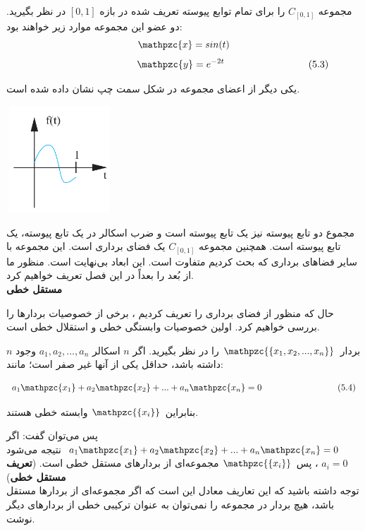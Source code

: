 \documentclass[a4paper,12pt]{report}
\begin{document}
	مجموعه $ C_{[0,1]} $ را برای تمام توابع پیوسته تعریف شده در بازه $ [0,1] $ در نظر بگیرید. دو عضو این مجموعه موارد زیر خواهند بود:
	$$
	 \mathpzc{x}=sin(t) 
	$$
	$$
	\hspace{3.5cm}  \mathpzc{y}=e^{-2t} \hspace{3cm} (5.3)
	$$ 
	
	یکی دیگر از اعضای مجموعه در شکل سمت چپ نشان داده شده است.
	
	\marginpar
	{
		\includegraphics[width=4cm, height=4cm]{125-1}	
	}
	
	مجموع دو تابع پیوسته نیز یک تابع پیوسته است و ضرب اسکالر در یک تابع پیوسته، یک تابع پیوسته است. همچنین مجموعه $ C_{[0,1]} $ یک فضای برداری است. این مجموعه با سایر فضاهای برداری که بحث کردیم متفاوت است. این ابعاد بی‌نهایت است. منظور ما از بُعد را بعداً در این فصل تعریف خواهیم کرد.\\
	
	\noindent\textbf{\Large{مستقل خطی}}
	
	حال که منظور از فضای برداری را تعریف کردیم ، برخی از خصوصیات بردارها را بررسی خواهیم کرد. اولین خصوصیات وابستگی خطی و استقلال خطی است.
	
	$ n $ بردار
	$ \mathpzc{\{x_1, x_2, ... ,x_n\}} $
	را در نظر بگیرید. اگر $ n $ اسکالر
	$ a_1, a_2, ... ,a_n $
	 وجود داشته باشد، حداقل یکی از آنها غیر صفر است؛ مانند:
	
	$$
	a_1\mathpzc{x_1} + a_2\mathpzc{x_2} + ... + a_n\mathpzc{x_n} = 0 \hspace{3cm} (5.4)
	$$
	
	بنابراین 
	$ \mathpzc{\{ x_i \}} $
	 وابسته خطی هستند.
	
	پس می‌توان گفت: اگر 
	$ a_1\mathpzc{x_1} + a_2\mathpzc{x_2} + ... + a_n\mathpzc{x_n} = 0 $
	 نتیجه می‌شود 
	$ a_i=0 $
	، پس 
	$ \mathpzc{\{ x_i \}} $
	 مجموعه‌ای از بردارهای مستقل خطی است. (\textbf{تعریف مستقل خطی})\\
	
	توجه داشته باشید که این تعاریف معادل این است که اگر مجموعه‌ای از بردارها مستقل باشد، هیچ بردار در مجموعه را نمی‌توان به عنوان ترکیبی خطی از بردارهای دیگر نوشت.
	
\end{document}
